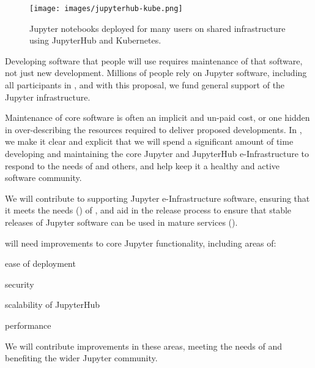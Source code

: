 \begin{task}[
  title=Maintenance of Jupyter and JupyterHub,
  id=maintenance,
  lead=SRL,
  PM=44,
  wphases={0-48},
  partners={QS,UPSUD,XFEL}
]

\begin{figure}[ht!]\centering
  \texttt{[image: images/jupyterhub-kube.png]}
  \caption{
  Jupyter notebooks deployed for many users
  on shared infrastructure using JupyterHub and Kubernetes.
  }
  \label{fig:jupyterhub-kubernetes}
\end{figure}

  Developing software that people will use requires maintenance of that software,
  not just new development.
  Millions of people rely on Jupyter software,
  including all participants in \TheProject,
  and with this proposal, we fund general support of the Jupyter infrastructure.

  Maintenance of core software is often an implicit and un-paid cost,
  or one hidden in over-describing the resources required to deliver
  proposed developments.
  In \TheProject, we make it clear and explicit that we will spend a significant amount
  of time developing and maintaining the core Jupyter and JupyterHub
  e-Infrastructure to respond to the needs of \TheProject and others,
  and help keep it a healthy and active software community.

  We will contribute to supporting Jupyter e-Infrastructure software,
  ensuring that it meets the needs ()
  of \TheProject,
  and aid in the release process to ensure that stable releases
  of Jupyter software can be used in mature \TheProject services
  ().

  \TheProject will need improvements to core Jupyter functionality, including areas of:

  \begin{compactenum}
    \item ease of deployment
    \item security
    \item scalability of JupyterHub
    \item performance
  \end{compactenum}

  We will contribute improvements in these areas,
  meeting the needs of \TheProject and benefiting the wider Jupyter
  community.

\end{task}
